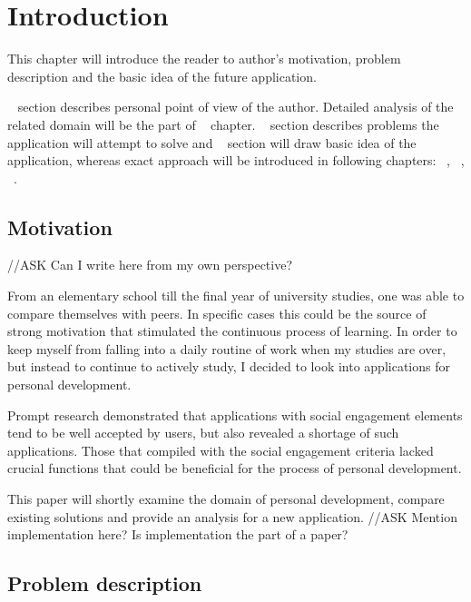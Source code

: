 

\chapter{Introduction}\label{ch:introduction}

This chapter will introduce the reader to author's motivation, problem description and the basic idea of the future application.

~ section describes personal point of view of the author.
Detailed analysis of the related domain will be the part of ~ chapter.
~ section describes problems the application will attempt to solve and
~ section will draw basic idea of the application, whereas exact approach
will be introduced in following chapters: ~, ~, ~.


\section{Motivation}\label{sec:introduction-motivation}

{\color{gray}//ASK Can I write here from my own perspective?}

From an elementary school till the final year of university studies, one was able to compare themselves with peers.
In specific cases this could be the source of strong motivation that stimulated the continuous process of learning.
In order to keep myself from falling into a daily routine of work when my studies are over,
but instead to continue to actively study, I decided to look into applications for personal development.

Prompt research demonstrated that applications with social engagement elements tend to be well accepted by users,
but also revealed a shortage of such applications.
Those that compiled with the social engagement criteria lacked crucial functions that could be beneficial for the process of personal development.

This paper will shortly examine the domain of personal development, compare existing solutions and provide an analysis for a
new application.
{\color{gray}//ASK Mention implementation here? Is implementation the part of a paper?}


\section{Problem description}\label{sec:problem-description}

